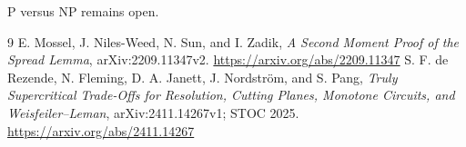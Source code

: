 \documentclass[11pt]{article}
\begin{document}
P versus NP remains open.

\begin{thebibliography}{9}
E. Mossel, J. Niles-Weed, N. Sun, and I. Zadik,
\emph{A Second Moment Proof of the Spread Lemma}, arXiv:2209.11347v2.
\url{https://arxiv.org/abs/2209.11347}
S. F. de Rezende, N. Fleming, D. A. Janett, J. Nordstr\"om, and S. Pang,
\emph{Truly Supercritical Trade-Offs for Resolution, Cutting Planes, Monotone
Circuits, and Weisfeiler--Leman}, arXiv:2411.14267v1; STOC 2025.
\url{https://arxiv.org/abs/2411.14267}
\end{thebibliography}

\end{document}
